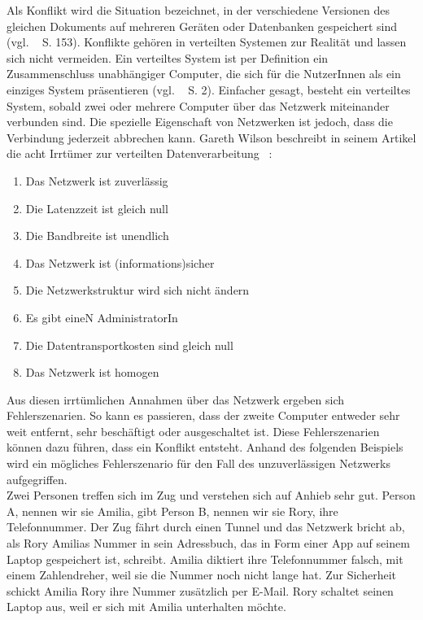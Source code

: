 Als Konflikt wird die Situation bezeichnet, in der verschiedene Versionen des gleichen Dokuments auf mehreren Geräten oder Datenbanken gespeichert sind (vgl. ~\cite{couchDB} S. 153).
Konflikte gehören in verteilten Systemen zur Realität und lassen sich nicht vermeiden.
Ein verteiltes System ist per Definition ein Zusammenschluss unabhängiger Computer, die sich für die NutzerInnen als ein einziges System präsentieren (vgl. ~\cite{tanenbaum} S. 2).
Einfacher gesagt, besteht ein verteiltes System, sobald zwei oder mehrere Computer über das Netzwerk miteinander verbunden sind.
Die spezielle Eigenschaft von Netzwerken ist jedoch, dass die Verbindung jederzeit abbrechen kann.
Gareth Wilson beschreibt in seinem Artikel die acht Irrtümer zur verteilten Datenverarbeitung ~\cite{fallacies}:
\begin{enumerate}
  \item Das Netzwerk ist zuverlässig
  \item Die \gls{Latenz}zeit ist gleich null
  \item Die Bandbreite ist unendlich
  \item Das Netzwerk ist (informations)sicher
  \item Die Netzwerkstruktur wird sich nicht ändern
  \item Es gibt eineN AdministratorIn
  \item Die Datentransportkosten sind gleich null
  \item Das Netzwerk ist homogen
\end{enumerate}
Aus diesen irrtümlichen Annahmen über das Netzwerk ergeben sich Fehlerszenarien. So kann es passieren, dass der zweite Computer entweder sehr weit entfernt, sehr beschäftigt oder ausgeschaltet ist. Diese Fehlerszenarien können dazu führen, dass ein Konflikt entsteht.
Anhand des folgenden Beispiels wird ein mögliches Fehlerszenario für den Fall des unzuverlässigen Netzwerks aufgegriffen.\\
%
Zwei Personen treffen sich im Zug und verstehen sich auf Anhieb sehr gut. Person A, nennen wir sie Amilia, gibt Person B, nennen wir sie Rory, ihre Telefonnummer. Der Zug fährt durch einen Tunnel und das Netzwerk bricht ab, als Rory Amilias Nummer in sein Adressbuch, das in Form einer \gls{App} auf seinem Laptop gespeichert ist, schreibt.
Amilia diktiert ihre Telefonnummer falsch, mit einem Zahlendreher, weil sie die Nummer noch nicht lange hat.
Zur Sicherheit schickt Amilia Rory ihre Nummer zusätzlich per E-Mail. Rory schaltet seinen Laptop aus, weil er sich mit Amilia unterhalten möchte.
